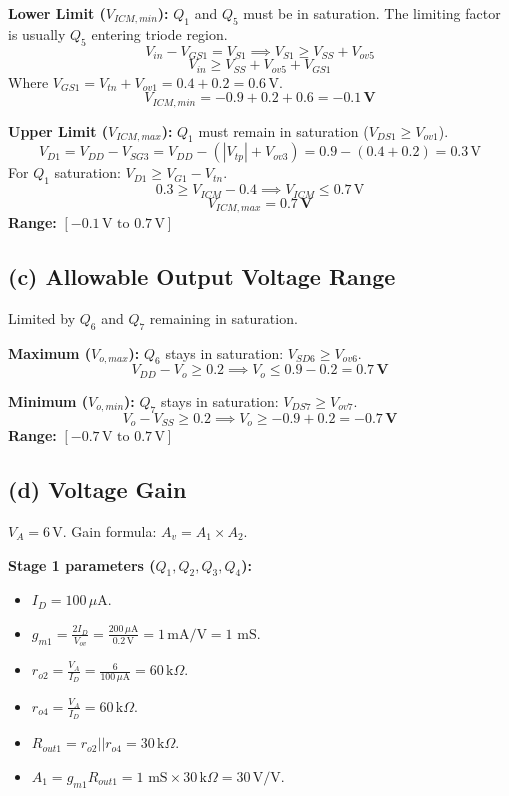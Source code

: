 \documentclass[11pt, a4paper]{article}
\newcommand{\uA}{\,\mu\text{A}}
\newcommand{\mA}{\,\text{mA}}
\newcommand{\kohm}{\,\text{k}\Omega}
\begin{document}
\textbf{Lower Limit ($V_{ICM,min}$):}
$Q_1$ and $Q_5$ must be in saturation. The limiting factor is usually $Q_5$ entering triode region.
\[ V_{in} - V_{GS1} = V_{S1} \implies V_{S1} \ge V_{SS} + V_{ov5} \]
\[ V_{in} \ge V_{SS} + V_{ov5} + V_{GS1} \]
Where $V_{GS1} = V_{tn} + V_{ov1} = 0.4 + 0.2 = 0.6\,\text{V}$.
\[ V_{ICM,min} = -0.9 + 0.2 + 0.6 = \mathbf{-0.1\,\text{V}} \]

\textbf{Upper Limit ($V_{ICM,max}$):}
$Q_1$ must remain in saturation ($V_{DS1} \ge V_{ov1}$).
\[ V_{D1} = V_{DD} - V_{SG3} = V_{DD} - (|V_{tp}| + V_{ov3}) = 0.9 - (0.4 + 0.2) = 0.3\,\text{V} \]
For $Q_1$ saturation: $V_{D1} \ge V_{G1} - V_{tn}$.
\[ 0.3 \ge V_{ICM} - 0.4 \implies V_{ICM} \le 0.7\,\text{V} \]
\[ V_{ICM,max} = \mathbf{0.7\,\text{V}} \]
\textbf{Range:} $[-0.1\,\text{V} \text{ to } 0.7\,\text{V}]$

\subsection*{(c) Allowable Output Voltage Range}
Limited by $Q_6$ and $Q_7$ remaining in saturation.

\textbf{Maximum ($V_{o,max}$):} $Q_6$ stays in saturation: $V_{SD6} \ge V_{ov6}$.
\[ V_{DD} - V_o \ge 0.2 \implies V_o \le 0.9 - 0.2 = \mathbf{0.7\,\text{V}} \]

\textbf{Minimum ($V_{o,min}$):} $Q_7$ stays in saturation: $V_{DS7} \ge V_{ov7}$.
\[ V_o - V_{SS} \ge 0.2 \implies V_o \ge -0.9 + 0.2 = \mathbf{-0.7\,\text{V}} \]
\textbf{Range:} $[-0.7\,\text{V} \text{ to } 0.7\,\text{V}]$

\subsection*{(d) Voltage Gain}
$V_A = 6\,\text{V}$. Gain formula: $A_v = A_1 \times A_2$.

\textbf{Stage 1 parameters ($Q_1, Q_2, Q_3, Q_4$):}
\begin{itemize}
    \item $I_D = 100 \uA$.
    \item $g_{m1} = \frac{2 I_D}{V_{ov}} = \frac{200 \uA}{0.2\,\text{V}} = 1 \mA/\text{V} = 1 \text{ mS}$.
    \item $r_{o2} = \frac{V_A}{I_D} = \frac{6}{100 \uA} = 60 \kohm$.
    \item $r_{o4} = \frac{V_A}{I_D} = 60 \kohm$.
    \item $R_{out1} = r_{o2} || r_{o4} = 30 \kohm$.
    \item $A_1 = g_{m1} R_{out1} = 1 \text{ mS} \times 30 \kohm = 30\,\text{V/V}$.
\end{itemize}
\end{document}
